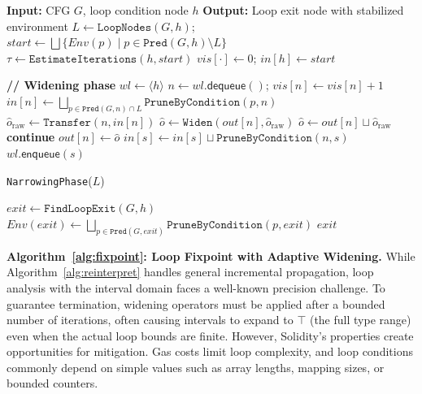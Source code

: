 \documentclass[pdflatex,sn-basic]{sn-jnl}%
\theoremstyle{thmstyleone}%
\theoremstyle{thmstyletwo}%
\theoremstyle{thmstylethree}%
\newcommand{\Env}{\mathit{Env}}
\begin{document}
\begin{algorithm}[!ht]
\caption{Loop Fixpoint with Adaptive Widening}
\label{alg:fixpoint}
\begin{algorithmic}[1]
\State \textbf{Input:} CFG $G$, loop condition node $h$
\State \textbf{Output:} Loop exit node with stabilized environment
  \State $L \gets \texttt{LoopNodes}(G, h)$; \quad $start \gets \bigsqcup\{\Env(p)\mid p\in\texttt{Pred}(G, h)\setminus L\}$
  \State $\tau \gets \texttt{EstimateIterations}(h, start)$ 
  \State $vis[\cdot]\gets 0$; \quad $in[h]\gets start$

  \State \textbf{// Widening phase}
  \State $wl\gets \langle h\rangle$
    \State $n\gets wl.\textsf{dequeue}()$; \quad $vis[n]\gets vis[n]+1$
       \State $in[n] \gets \bigsqcup_{p\in\texttt{Pred}(G, n)\cap L} \texttt{PruneByCondition}(p,n)$
    \EndIf
    \State $\hat{o}_{\text{raw}}\gets \texttt{Transfer}(n,in[n])$ 
       \State $\hat{o}\gets \texttt{Widen}(out[n],\hat{o}_{\text{raw}})$ 
    \Else \State $\hat{o}\gets out[n]\sqcup \hat{o}_{\text{raw}}$
    \EndIf
     \textbf{continue} 
    \EndIf
    \State $out[n]\gets \hat{o}$
      \State $in[s] \gets in[s] \sqcup \texttt{PruneByCondition}(n,s)$
      \State $wl.\textsf{enqueue}(s)$
    \EndFor
  \EndWhile

  \State \texttt{NarrowingPhase}($L$) 

  \State $exit \gets \texttt{FindLoopExit}(G, h)$
  \State $\Env(exit) \gets \bigsqcup_{p\in\texttt{Pred}(G, exit)} \texttt{PruneByCondition}(p,exit)$ 
  \State \Return $exit$
\EndFunction
\end{algorithmic}
\end{algorithm}

\noindent\textbf{Algorithm~\ref{alg:fixpoint}: Loop Fixpoint with Adaptive Widening.}
While Algorithm~\ref{alg:reinterpret} handles general incremental propagation,
loop analysis with the interval domain faces a well-known precision challenge.
To guarantee termination, widening operators must be applied after a bounded number of iterations,
often causing intervals to expand to $\top$ (the full type range) even when the actual loop bounds are finite.
However, Solidity's properties create opportunities for mitigation.
Gas costs limit loop complexity, and loop conditions commonly depend on simple values
such as array lengths, mapping sizes, or bounded counters.
\end{document}
